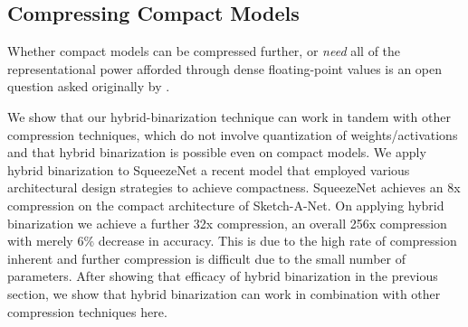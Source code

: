 \documentclass[10pt,twocolumn,letterpaper]{article}
\begin{document}
\subsection{Compressing Compact Models}
Whether compact models can be compressed further, or {\it need} all of the representational power afforded through dense floating-point values is an open question asked originally by \cite{iandola2016squeezenet}. 

We show that our hybrid-binarization technique can work in tandem with other compression techniques, which do not involve quantization of weights/activations and that hybrid binarization is possible even on compact models. We apply hybrid binarization to SqueezeNet\cite{iandola2016squeezenet} %
a recent model that employed various architectural design strategies to achieve compactness. SqueezeNet achieves an 8x compression on the compact architecture of Sketch-A-Net. On applying hybrid binarization we achieve a further 32x compression, an overall 256x compression with merely 6\% decrease in accuracy. This is due to the high rate of compression inherent and further compression is difficult due to the small number of parameters. After showing that efficacy of hybrid binarization in the previous section, we show that hybrid binarization can work in combination with other compression techniques here.

\begin{table}[t]
\centering
{}
\caption{Our performance on SqueezeNet, an explicitly compressed model architecture. Although SqueezeNet is an inherently compressed model, our method still achieves further compression on it.}
\label{table:squeezenet}
\vspace{-0.4cm}
\end{table}
\end{document}
